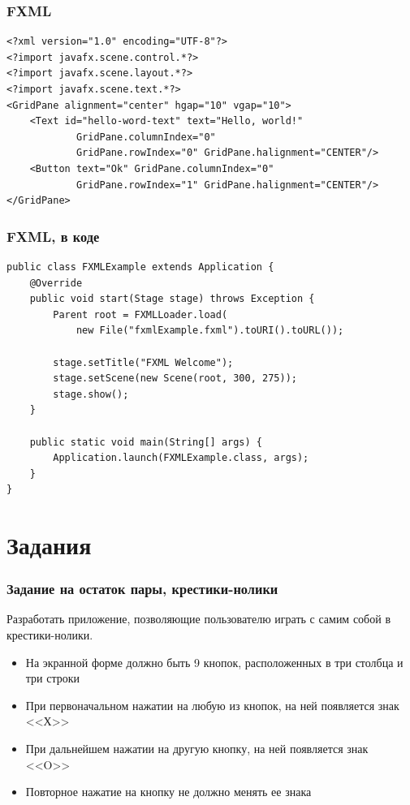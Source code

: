 \documentclass[xetex,mathserif,serif]{beamer}
\begin{document}
	\begin{frame}[fragile]
		\frametitle{FXML}
		\begin{verbatim}
<?xml version="1.0" encoding="UTF-8"?>
<?import javafx.scene.control.*?>
<?import javafx.scene.layout.*?>
<?import javafx.scene.text.*?>
<GridPane alignment="center" hgap="10" vgap="10">
    <Text id="hello-word-text" text="Hello, world!"
            GridPane.columnIndex="0"
            GridPane.rowIndex="0" GridPane.halignment="CENTER"/>
    <Button text="Ok" GridPane.columnIndex="0"
            GridPane.rowIndex="1" GridPane.halignment="CENTER"/>
</GridPane>
		\end{verbatim}
\end{frame}

	\begin{frame}[fragile]
		\frametitle{FXML, в коде}
		\begin{verbatim}
public class FXMLExample extends Application {
    @Override
    public void start(Stage stage) throws Exception {
        Parent root = FXMLLoader.load(
            new File("fxmlExample.fxml").toURI().toURL());

        stage.setTitle("FXML Welcome");
        stage.setScene(new Scene(root, 300, 275));
        stage.show();
    }

    public static void main(String[] args) {
        Application.launch(FXMLExample.class, args);
    }
}
		\end{verbatim}
\end{frame}

	\section{Задания}

	\begin{frame}
		\frametitle{Задание на остаток пары, крестики-нолики}
		Разработать приложение, позволяющие пользователю играть с самим собой в крестики-нолики. 
		\begin{itemize}
			\item На экранной форме должно быть 9 кнопок, расположенных в три столбца и три строки
			\item При первоначальном нажатии на любую из кнопок, на ней появляется знак <<Х>> 
			\item При дальнейшем нажатии на другую кнопку, на ней появляется знак <<O>>
			\item Повторное нажатие на кнопку не должно менять ее знака
		\end{itemize}
	\end{frame}
\end{document}
